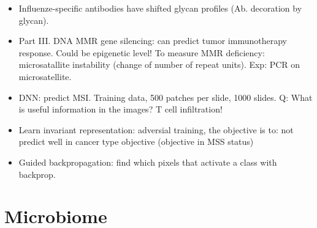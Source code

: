 \documentclass{report}
\begin{document}
\begin{itemize}
	\item Influenze-specific antibodies have shifted glycan profiles (Ab. decoration by glycan).
	
	\item Part III. DNA MMR gene silencing: can predict tumor immunotherapy response. Could be epigenetic level! To measure MMR deficiency: microsatallite instability (change of number of repeat units). Exp: PCR on microsatellite.
	
	\item DNN: predict MSI. Training data, 500 patches per slide, 1000 slides. Q: What is useful information in the images? T cell infiltration!
	
	\item Learn invariant representation: adversial training, the objective is to: not predict well in cancer type objective (objective in MSS status)
	
	\item Guided backpropagation: find which pixels that activate a class with backprop.
\end{itemize}
	
\section{Microbiome}
\end{document}
